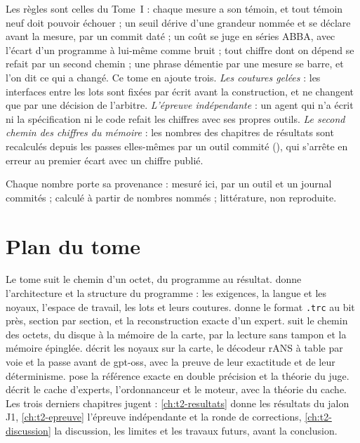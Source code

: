 Les règles sont celles du Tome~I : chaque mesure a son témoin, et tout témoin neuf doit pouvoir échouer ; un seuil dérive d'une grandeur nommée et se déclare avant la mesure, par un commit daté ; un coût se juge en séries ABBA, avec l'écart d'un programme à lui-même comme bruit ; tout chiffre dont on dépend se refait par un second chemin ; une phrase démentie par une mesure se barre, et l'on dit ce qui a changé. Ce tome en ajoute trois. \emph{Les coutures gelées} : les interfaces entre les lots sont fixées par écrit avant la construction, et ne changent que par une décision de l'arbitre. \emph{L'épreuve indépendante} : un agent qui n'a écrit ni la spécification ni le code refait les chiffres avec ses propres outils. \emph{Le second chemin des chiffres du mémoire} : les nombres des chapitres de résultats sont recalculés depuis les passes elles-mêmes par un outil commité (), qui s'arrête en erreur au premier écart avec un chiffre publié.

Chaque nombre porte sa provenance : \mes{} mesuré ici, par un outil et un journal commités ; \calc{} calculé à partir de nombres nommés ; \litt{} littérature, non reproduite.

\section{Plan du tome}\label{t2i-sec:plan}

Le tome suit le chemin d'un octet, du programme au résultat.  donne l'architecture et la structure du programme : les exigences, la langue et les noyaux, l'espace de travail, les lots et leurs coutures.  donne le format \texttt{.trc} au bit près, section par section, et la reconstruction exacte d'un expert.  suit le chemin des octets, du disque à la mémoire de la carte, par la lecture sans tampon et la mémoire épinglée.  décrit les noyaux sur la carte, le décodeur rANS à table par voie et la passe avant de gpt-oss, avec la preuve de leur exactitude et de leur déterminisme.  pose la référence exacte en double précision et la théorie du juge.  décrit le cache d'experts, l'ordonnanceur et le moteur, avec la théorie du cache. Les trois derniers chapitres jugent : \cref{ch:t2-resultats} donne les résultats du jalon J1, \cref{ch:t2-epreuve} l'épreuve indépendante et la ronde de corrections, \cref{ch:t2-discussion} la discussion, les limites et les travaux futurs, avant la conclusion.
